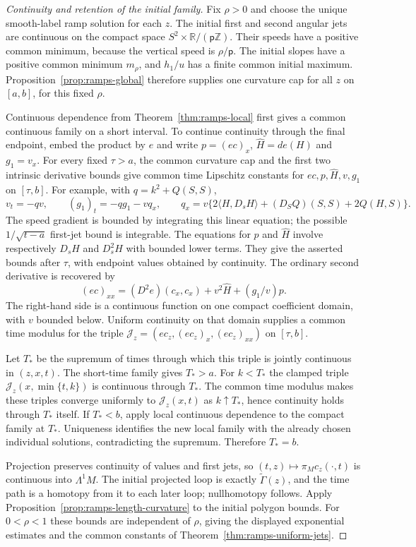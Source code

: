 \begin{proof}[Continuity and retention of the initial family]
Fix $\rho>0$ and choose the unique smooth-label ramp solution for each
$z$.  The initial first and second angular jets are continuous on the
compact space $S^2\times\mathbb R/(\mathsf p\mathbb Z)$.
Their speeds have a positive common minimum, because the vertical speed
is $\rho/\mathsf p$.  The initial slopes have a positive common minimum
$m_\rho$, and $h_1/u$ has a finite common initial maximum.
Proposition~\ref{prop:ramps-global} therefore supplies one curvature cap
for all $z$ on $[a,b]$, for this fixed $\rho$.

Continuous dependence from Theorem~\ref{thm:ramps-local} first gives a
common continuous family on a short interval.  To continue continuity
through the final endpoint, embed the product by $e$ and write
$p=(ec)_x$, $\widehat H=de(H)$ and $g_1=v_x$.
For every fixed $\tau>a$, the common curvature cap and the first two
intrinsic derivative bounds give common time Lipschitz constants for
$ec,p,\widehat H,v,g_1$ on $[\tau,b]$.
For example, with $q=k^2+Q(S,S)$,
\[
 v_t=-qv,\qquad (g_1)_t=-qg_1-vq_x,\qquad
 q_x=v\{2\langle H,D_sH\rangle+(D_SQ)(S,S)+2Q(H,S)\}.
\]
The speed gradient is bounded by integrating this linear equation;
the possible $1/\sqrt{t-a}$ first-jet bound is integrable.
The equations for $p$ and $\widehat H$ involve respectively
$D_sH$ and $D_s^2H$ with bounded lower terms.  They give the
asserted bounds after $\tau$, with endpoint values obtained by
continuity.  The ordinary second derivative is recovered by
\[
 (ec)_{xx}=(D^2e)(c_x,c_x)+v^2\widehat H+(g_1/v)p.
\]
The right-hand side is a continuous function on one compact
coefficient domain, with $v$ bounded below.  Uniform continuity
on that domain supplies a common time modulus for the triple
$\mathcal J_z=(ec_z,(ec_z)_x,(ec_z)_{xx})$ on $[\tau,b]$.

Let $T_*$ be the supremum of times through which this triple
is jointly continuous in $(z,x,t)$.  The short-time family gives
$T_*>a$.  For $k<T_*$ the clamped triple
$\mathcal J_z(x,\min\{t,k\})$ is continuous through $T_*$.
The common time modulus makes these triples converge uniformly
to $\mathcal J_z(x,t)$ as $k\uparrow T_*$, hence continuity
holds through $T_*$ itself.  If $T_*<b$, apply local continuous
dependence to the compact family at $T_*$.  Uniqueness identifies
the new local family with the already chosen individual solutions,
contradicting the supremum.  Therefore $T_*=b$.

Projection preserves continuity of values and first jets, so
$(t,z)\mapsto\pi_Mc_z(\cdot,t)$ is continuous into $\Lambda^1M$.
The initial projected loop is exactly $\widetilde\Gamma(z)$, and the time
path is a homotopy from it to each later loop; nullhomotopy follows.
Apply Proposition~\ref{prop:ramps-length-curvature} to the initial polygon
bounds.  For $0<\rho<1$ these bounds are independent of $\rho$, giving
the displayed exponential estimates and the common constants of
Theorem~\ref{thm:ramps-uniform-jets}.
\end{proof}

